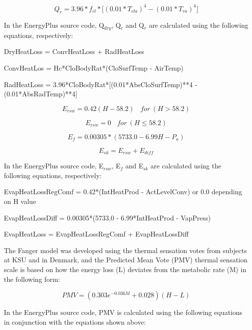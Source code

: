 \begin{equation}
{Q_{r}}=3.96*f_{cl}*{[}(0.01*T_{cla})^{4}-(0.01*T_{ra})^{4}{]}
\label{eq:FangerQr}
\end{equation}

In the EnergyPlus source code, Q\(_{dry}\), Q\(_{c}\) and Q\(_{r}\) are calculated using the following equations, respectively:

DryHeatLoss = ConvHeatLoss + RadHeatLoss

ConvHeatLos = Hc*CloBodyRat*(CloSurfTemp - AirTemp)

RadHeatLoss = 3.96*CloBodyRat*{[}(0.01*AbsCloSurfTemp)**4 - (0.01*AbsRadTemp)**4{]}

\begin{equation}
{E_{rsw}} = 0.42(H - 58.2)~~~~for~\left(H > 58.2\right)
\end{equation}

\begin{equation}
{E_{rsw}} = 0~~~~for~\left(H \le 58.2\right)
\end{equation}

\begin{equation}
{E_{f}}=0.00305*(5733.0-6.99H-P_{a})
\end{equation}

\begin{equation}
{E_{sk}} = {E_{rsw}} + {E_{diff}}
\end{equation}

In the EnergyPlus source code, E\(_{rsw}\), E\(_{f}\) and E\(_{sk}\) are calculated using the following equations, respectively:

EvapHeatLossRegComf = 0.42*(IntHeatProd - ActLevelConv) or 0.0 depending on H value

EvapHeatLossDiff = 0.00305*(5733.0 - 6.99*IntHeatProd - VapPress)

EvapHeatLoss = EvapHeatLossRegComf + EvapHeatLossDiff

The Fanger model was developed using the thermal sensation votes from subjects at KSU and in Denmark, and the Predicted Mean Vote (PMV) thermal sensation scale is based on how the energy loss (L) deviates from the metabolic rate (M) in the following form:

\begin{equation}
PMV = (0.303{e^{ - 0.036M}} + 0.028)(H - L)
\end{equation}

In the EnergyPlus source code, PMV is calculated using the following equations in conjunction with the equations shown above:

